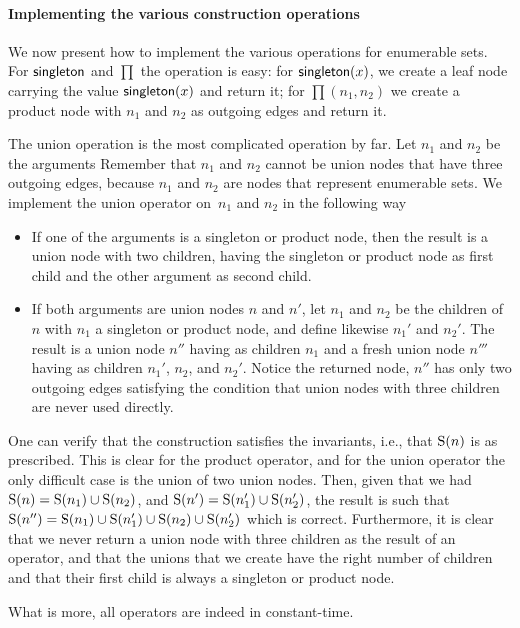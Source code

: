 \paragraph{Implementing the various construction operations}
We now present how to implement the various operations for enumerable
sets. For $\textsf{singleton}$ and $\prod$ the operation is easy: for
$\textsf{singleton}(x)$, we create a leaf node carrying the value
$\textsf{singleton}(x)$ and return it; for $\prod(n_1,n_2)$ we
create a product node with $n_1$ and $n_2$ as outgoing edges and
return it.

The union operation is the most complicated operation by far.  Let $n_1$ and
$n_2$ be the arguments
Remember that $n_1$ and $n_2$ cannot be union nodes that have three outgoing
edges, because $n_1$ and $n_2$ are nodes that represent enumerable sets.
We implement the union operator on~$n_1$ and $n_2$ 
in the following way
\begin{itemize}
%
%
  \item If one of the arguments is a singleton or product node, then
    the result is a union node with two children, having the singleton
    or product node as first child and the other argument as second
    child.
    \item If both arguments are union nodes $n$ and $n'$, let
    $n_1$ and $n_2$ be the children of $n$ with $n_1$ a singleton or
    product node, and define likewise $n_1'$ and $n_2'$. The result is
    a union node $n''$ having as children $n_1$ and a fresh 
    union node $n'''$ having as children $n_1'$, $n_2$, and $n_2'$.
    Notice the returned node, $n''$ has only two outgoing edges satisfying the
    condition that union nodes with three children are never used directly.
\end{itemize}

One can verify that the construction satisfies the invariants, i.e.,
that $\mathrm{S}(n)$ is as prescribed. This is clear for the product
operator, and for the union operator the only difficult case is the
union of two union nodes. Then, given that we had $\mathrm{S}(n)
= \mathrm{S}(n_1) \cup \mathrm{S}(n_2)$, and $\mathrm{S}(n') = \mathrm{S}(n_1') \cup
\mathrm{S}(n_2')$, the result is such that $\mathrm{S}(n'') = \mathrm{S}(n_1) \cup \mathrm{S}(n_1') \cup \mathrm{S}(n_2)
\cup \mathrm{S}(n_2')$ which is correct. Furthermore, it is clear that we never return
a union node with three children as the result of an operator, and
that the unions that we create have the right number of children and
that their first child is always a singleton or product node.

What is more, all operators are indeed in constant-time.

